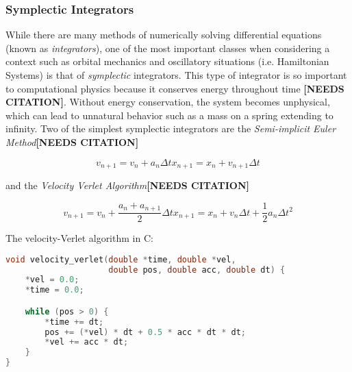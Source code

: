 \documentclass{report}
\begin{document}
            \subsubsection{Symplectic Integrators}

                While there are many methods of numerically solving differential equations (known as \emph{integrators}), one of the most important classes when considering a context such as orbital mechanics and oscillatory situations (i.e. Hamiltonian Systems) is that of \emph{symplectic} integrators.  This type of integrator is so important to computational physics because it conserves energy throughout time \textbf{[NEEDS CITATION]}.  Without energy conservation, the system becomes unphysical, which can lead to unnatural behavior such as a mass on a spring extending to infinity.  Two of the simplest symplectic integrators are the \emph{Semi-implicit Euler Method}\textbf{[NEEDS CITATION]}

                \begin{subequations} \label{eq:semiEuler}
                    \begin{equation}
                        v_{n+1} = v_n + a_n \Delta t
                    \end{equation}
                    \begin{equation}
                        x_{n + 1} = x_n + v_{n+1} \Delta t
                    \end{equation}
                \end{subequations}

                and the \emph{Velocity Verlet Algorithm}\textbf{[NEEDS CITATION]}

                \begin{subequations} \label{eq:verlet}
                    \begin{equation}
                        v_{n+1} = v_n + \frac{a_n + a_{n+1}}{2} \Delta t
                    \end{equation}
                    \begin{equation}
                        x_{n + 1} = x_n + v_{n} \Delta t + \frac{1}{2} a_n \Delta t^2
                    \end{equation}
                \end{subequations}

                The velocity-Verlet algorithm in C:

                \begin{lstlisting}[language=C]
void velocity_verlet(double *time, double *vel,
                     double pos, double acc, double dt) {
    *vel = 0.0;
    *time = 0.0;

    while (pos > 0) {
        *time += dt;
        pos += (*vel) * dt + 0.5 * acc * dt * dt;
        *vel += acc * dt;
    }
}               \end{lstlisting}
\end{document}
